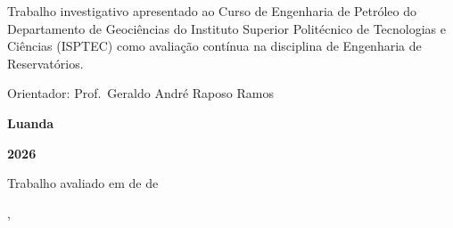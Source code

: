\documentclass[12pt,a4paper,oneside,brazilian,sumario=tradicional]{abntex2}
\begin{document}
\hspace*{3.5cm}\begin{minipage}[t]{9.5cm}
Trabalho investigativo apresentado ao Curso de Engenharia de Petróleo do Departamento de Geociências do Instituto Superior Politécnico de Tecnologias e Ciências (ISPTEC) como avaliação contínua na disciplina de Engenharia de Reservatórios.

\vspace*{1.0cm}

\noindent Orientador: Prof.\ Geraldo André Raposo Ramos
\end{minipage}

\vspace*{2.0cm}

\begin{center}
  {\large\bfseries Luanda}
  
  {\large\bfseries 2026}
\end{center}

\clearpage

\begin{folhadeaprovacao}
  \thispagestyle{empty}
  \begin{center}
    {\ABNTEXchapterfont\large\MakeUppercase{\imprimirautor}}
    \vspace*{1cm}
    \begin{center}
      \ABNTEXchapterfont\bfseries\large\MakeUppercase{\imprimirtitulo}
    \end{center}
    \vspace*{1cm}
    \hspace{.38\textwidth}
    \begin{minipage}{.56\textwidth}
      \imprimirpreambulo
    \end{minipage}
    \vspace*{1cm}
  \end{center}
  Trabalho avaliado em \underline{\hspace{2.0cm}} de \underline{\hspace{3.5cm}} de \underline{\hspace{1.2cm}}
  \vspace{1.5cm}
  \begin{center}
    \imprimirlocal, \imprimirdata
  \end{center}
\end{folhadeaprovacao}
\end{document}
